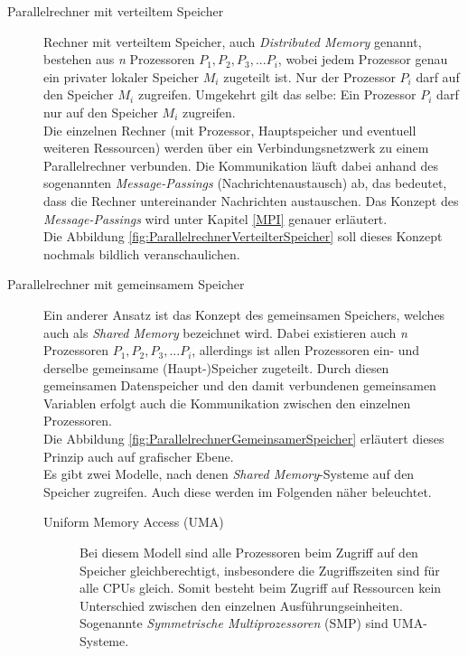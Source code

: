 				\begin{description}
					\item [Parallelrechner mit verteiltem Speicher]
						Rechner mit verteiltem Speicher, auch \textit{Distributed Memory} genannt, bestehen aus \textit{n} Prozessoren $P_1, P_2, P_3, ... P_i$, wobei jedem Prozessor genau ein privater lokaler Speicher $M_i$ zugeteilt ist. Nur der Prozessor $P_i$ darf auf den Speicher $M_i$ zugreifen. Umgekehrt gilt das selbe: Ein Prozessor $P_i$ darf nur auf den Speicher $M_i$ zugreifen.\\
						Die einzelnen Rechner (mit Prozessor, Hauptspeicher und eventuell weiteren Ressourcen) werden über ein Verbindungsnetzwerk zu einem Parallelrechner verbunden. Die Kommunikation läuft dabei anhand des sogenannten \textit{Message-Passings} (Nachrichtenaustausch) ab, das bedeutet, dass die Rechner untereinander Nachrichten austauschen. Das Konzept des \textit{Message-Passings} wird unter Kapitel \ref{MPI} genauer erläutert.\\
						Die Abbildung \ref{fig:ParallelrechnerVerteilterSpeicher} soll dieses Konzept nochmals bildlich veranschaulichen. \cite{EntwicklungParallelerProgramme}
						
					\item[Parallelrechner mit gemeinsamem Speicher]
						Ein anderer Ansatz ist das Konzept des gemeinsamen Speichers, welches auch als \textit{Shared Memory} bezeichnet wird. Dabei existieren auch \textit{n} Prozessoren $P_1, P_2, P_3, ... P_i$, allerdings ist allen Prozessoren ein- und derselbe gemeinsame (Haupt-)Speicher zugeteilt. Durch diesen gemeinsamen Datenspeicher und den damit verbundenen gemeinsamen Variablen erfolgt auch die Kommunikation zwischen den einzelnen Prozessoren.\\
						Die Abbildung \ref{fig:ParallelrechnerGemeinsamerSpeicher} erläutert dieses Prinzip auch auf grafischer Ebene.\\
						Es gibt zwei Modelle, nach denen \textit{Shared Memory}-Systeme auf den Speicher zugreifen. Auch diese werden im Folgenden näher beleuchtet. \cite{EntwicklungParallelerProgramme}
						
						\begin{description}
							\item [Uniform Memory Access (UMA)]
								Bei diesem Modell sind alle Prozessoren beim Zugriff auf den Speicher gleichberechtigt, insbesondere die Zugriffszeiten sind für alle CPUs gleich. Somit besteht beim Zugriff auf Ressourcen kein Unterschied zwischen den einzelnen Ausführungseinheiten.\\
								Sogenannte \textit{Symmetrische Multiprozessoren} (SMP) sind UMA-Systeme. \cite{EntwicklungParallelerProgramme}
								

\end{description}
\end{description}
